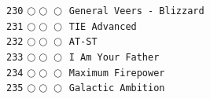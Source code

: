 \documentclass[a4paper,landscape]{article}
\begin{document}
\begin{multicols*}{5}
\texttt{230} \(\bigcirc\!\bigcirc\!\bigcirc\)  \texttt{General Veers - Blizzard } \vspace{-0.3mm}\\ 
\texttt{231} \(\bigcirc\!\bigcirc\!\bigcirc\)  \texttt{TIE Advanced} \vspace{-0.3mm}\\ 
\texttt{232} \(\bigcirc\!\bigcirc\!\bigcirc\)  \texttt{AT-ST} \vspace{-0.3mm}\\ 
\texttt{233} \(\bigcirc\!\bigcirc\!\bigcirc\)  \texttt{I Am Your Father} \vspace{-0.3mm}\\ 
\texttt{234} \(\bigcirc\!\bigcirc\!\bigcirc\)  \texttt{Maximum Firepower} \vspace{-0.3mm}\\ 
\texttt{235} \(\bigcirc\!\bigcirc\!\bigcirc\)  \texttt{Galactic Ambition} \vspace{-0.3mm}\\ 

\end{multicols*}
\end{document}
